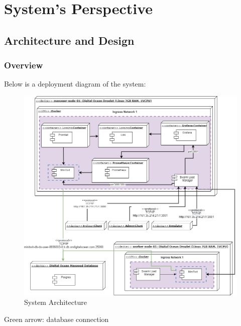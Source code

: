 \section{System's Perspective}

\subsection{Architecture and Design}

\subsubsection{Overview}
Below is a deployment diagram of the system:
\begin{figure}[h!]
    \centering
    \includegraphics[width=1.2\linewidth]{report/images/system-architecture.png}
    \caption{System Architecture}
    \label{fig:arcitechture-overview}
\end{figure}

Green arrow: database connection\\

